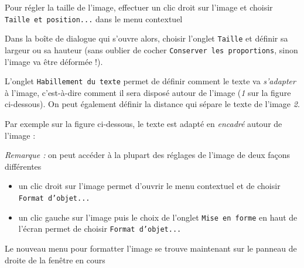 Pour régler la taille de l'image, effectuer un clic droit sur l'image et choisir  \texttt{Taille et position...}  dans le menu contextuel


Dans la boîte de dialogue qui s'ouvre alors, choisir l'onglet \texttt{Taille} et définir sa largeur ou sa hauteur (sans oublier de cocher \texttt{Conserver les proportions}, sinon l'image va être déformée !). 


L'onglet \texttt{Habillement du texte} permet de définir comment le texte va \emph{s'adapter} à l'image, c'est-à-dire comment il sera disposé autour de l'image (\emph{1} sur la figure ci-dessous). On peut également définir la distance qui sépare le texte de l'image \emph{2}.  




Par exemple sur la figure ci-dessous, le texte est adapté en \emph{encadré} autour de l'image : 








\emph{Remarque :} on peut accéder à la plupart des réglages de l'image de deux façons différentes\\

\begin{itemize}
\item un clic droit sur l'image permet d'ouvrir le menu contextuel et de choisir \texttt{Format d'objet...}


\item un clic gauche sur l'image puis le choix de l'onglet \texttt{Mise en forme} en haut de l'écran permet de choisir \texttt{Format d'objet...} 

\end{itemize}

Le nouveau menu pour formatter l'image se trouve maintenant sur le panneau de droite de la fenêtre en cours





